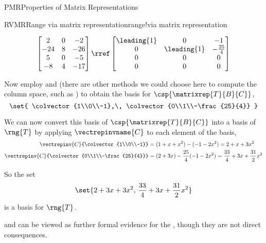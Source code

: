 \begin{subsect}{PMR}{Properties of Matrix Representations}
\begin{example}{RVMR}{Range via matrix representation}{range!via matrix representation}
\begin{para}
\begin{equation*}
\begin{bmatrix}
2 & 0 & -2 \\
-24 & 8 & -26 \\
5 & 0 & -5 \\
-8 & 4 & -17
\end{bmatrix}
\rref
\begin{bmatrix}
\leading{1} & 0 & -1 \\
0 & \leading{1} & -\frac{25}{4} \\
0 & 0 & 0 \\
0 & 0 & 0
\end{bmatrix}
\end{equation*}
\end{para}
%
\begin{para}Now employ  and  (there are other methods we could choose here to compute the column space, such as ) to obtain the basis for $\csp{\matrixrep{T}{B}{C}}$,
%
\begin{equation*}
\set{
\colvector{1\\0\\-1},\,
\colvector{0\\1\\-\frac{25}{4}}
}
\end{equation*}
\end{para}
%
\begin{para}We can  now convert this basis of $\csp{\matrixrep{T}{B}{C}}$ into a basis of $\rng{T}$ by applying $\vectrepinvname{C}$ to each element of the basis,
%
\begin{align*}
\vectrepinv{C}{\colvector{1\\0\\-1}}&=
(1+x+x^2)-(-1-2x^2)=2+x+3x^2\\
%
\vectrepinv{C}{\colvector{0\\1\\-\frac{25}{4}}}&=
(2+3x)-\frac{25}{4}(-1-2x^2)=\frac{33}{4}+3x+\frac{31}{2}x^2
\end{align*}
\end{para}
%
\begin{para}So the set
%
\begin{equation*}
\set{
2+3x+3x^2,\,
\frac{33}{4}+3x+\frac{31}{2}x^2
}
\end{equation*}
%
is a basis for $\rng{T}$.
\end{para}
%
\end{example}
%
\begin{para} and  can be viewed as further formal evidence for the , though they are not direct consequences.\end{para}
%
%
\end{subsect}
